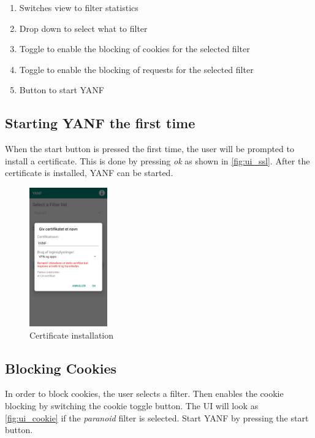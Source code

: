 \documentclass[main.tex]{subfiles}
\begin{document}
\begin{enumerate}
    \item Switches view to filter statistics
    \item Drop down to select what to filter
    \item Toggle to enable the blocking of cookies for the selected filter
    \item Toggle to enable the blocking of requests for the selected filter
    \item Button to start YANF
\end{enumerate}

\subsection{Starting YANF the first time}
\label{sec:YANF_First}
When the start button is pressed the first time, the user will be prompted to install a certificate. This is done by pressing \textit{ok} as shown in \autoref{fig:ui_ssl}. After the certificate is installed, YANF can be started.

\begin{figure}[H]
    \centering
    \includegraphics[width=0.3\textwidth]{1_Appendix/UI/install_certificate.jpg}
    \caption{Certificate installation}
    \label{fig:ui_ssl}
\end{figure}

\subsection{Blocking Cookies}
\label{UG-BlockingCookies}
In order to block cookies, the user selects a filter. Then enables the cookie blocking by switching the cookie toggle button. The UI will look as \autoref{fig:ui_cookie} if the \textit{paranoid} filter is selected. Start YANF by pressing the start button.
\end{document}
